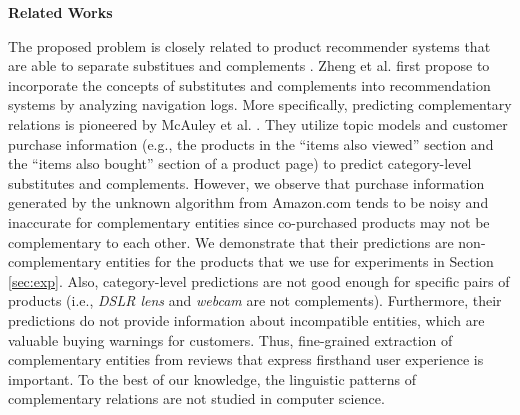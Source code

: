 

\textbf{Related Works}
\label{sec:rw}

The proposed problem is closely related to product recommender systems that are able to separate substitues and complements  \cite{McAPanLes15,zheng2009substitutes}. Zheng et al. \cite{zheng2009substitutes} first propose to incorporate the concepts of substitutes and complements into recommendation systems by analyzing navigation logs. More specifically, predicting complementary relations is pioneered by McAuley et al. \cite{McAPanLes15}. They utilize topic models and customer purchase information (e.g., the products in the ``items also viewed'' section and the ``items also bought'' section of a product page) to predict category-level substitutes and complements. However, we observe that purchase information generated by the unknown algorithm from Amazon.com tends to be noisy and inaccurate for complementary entities since co-purchased products may not be complementary to each other. We demonstrate that their predictions are non-complementary entities for the products that we use for experiments in Section \ref{sec:exp}. Also, category-level predictions are not good enough for specific pairs of products (i.e., \textit{DSLR lens} and \textit{webcam} are not complements). Furthermore, their predictions do not provide information about incompatible entities, which are valuable buying warnings for customers. Thus, fine-grained extraction of complementary entities from reviews that express firsthand user experience is important. To the best of our knowledge, the linguistic patterns of complementary relations are not studied in computer science.

